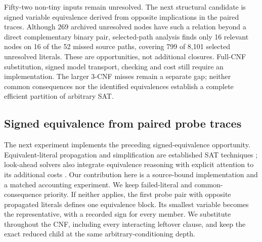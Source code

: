 \documentclass[11pt,a4paper]{article}
\numberwithin{equation}{section}
\theoremstyle{plain}
\theoremstyle{definition}
\theoremstyle{remark}
\begin{document}
Fifty-two non-tiny inputs remain unresolved. The next structural candidate is signed variable equivalence derived from opposite implications in the paired traces. Although 269 archived unresolved nodes have such a relation beyond a direct complementary binary pair, selected-path analysis finds only 16 relevant nodes on 16 of the 52 missed source paths, covering 799 of 8,101 selected unresolved literals. These are opportunities, not additional closures. Full-CNF substitution, signed model transport, checking and cost still require an implementation. The larger 3-CNF misses remain a separate gap; neither common consequences nor the identified equivalences establish a complete efficient partition of arbitrary SAT.

\subsection{Signed equivalence from paired probe traces}
\label{sec:probe-equivalence}

The next experiment implements the preceding signed-equivalence opportunity. Equivalent-literal propagation and simplification are established SAT techniques \citep{li2003equivalent}; look-ahead solvers also integrate equivalence reasoning with explicit attention to its additional costs \citep{heule2005marcheq}. Our contribution here is a source-bound implementation and a matched accounting experiment. We keep failed-literal and common-consequence priority. If neither applies, the first probe pair with opposite propagated literals defines one equivalence block. Its smallest variable becomes the representative, with a recorded sign for every member. We substitute throughout the CNF, including every interacting leftover clause, and keep the exact reduced child at the same arbitrary-conditioning depth.
\end{document}
